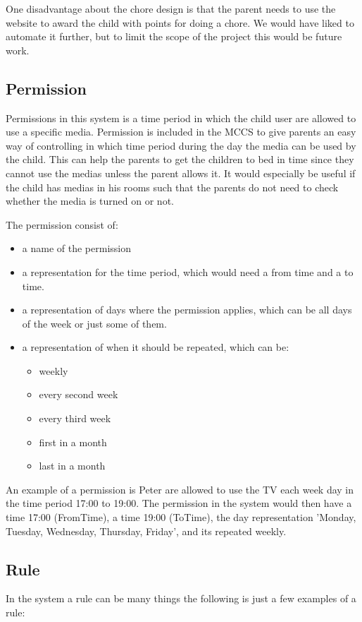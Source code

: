 One disadvantage about the chore design is that the parent needs to use the website to award the child with points for doing a chore. We would have liked to automate it further, but to limit the scope of the project this would be future work.  

\subsection{Permission}
Permissions in this system is a time period in which the child user are allowed to use a specific media. Permission is included in the MCCS to give parents an easy way of controlling in which time period during the day the media can be used by the child. This can help the parents to get the children to bed in time since they cannot use the medias unless the parent allows it. It would especially be useful if the child has medias in his rooms such that the parents do not need to check whether the media is turned on or not. 

The permission consist of:
\begin{itemize}
	\item a name of the permission
	\item a representation for the time period, which would need a from time and a to time. 
	\item a representation of days where the permission applies, which can be all days of the week or just some of them.
	\item a representation of when it should be repeated, which can be:
		\begin{itemize}
		\item weekly
		\item every second week
		\item every third week
		\item first in a month
		\item last in a month
		\end{itemize}
\end{itemize}

An example of a permission is Peter are allowed to use the TV each week day in the time period 17:00 to 19:00. The permission in the system would then have a time 17:00 (FromTime), a time 19:00 (ToTime), the day representation 'Monday, Tuesday, Wednesday, Thursday, Friday', and its repeated weekly.


\subsection{Rule}
In the system a rule can be many things the following is just a few examples of a rule:


